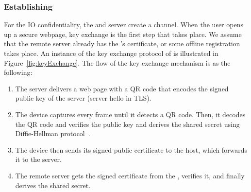 \subsubsection{Establishing \tls}
\label{sec:prototype:impl:tls}
%
For the IO confidentiality, the \device and server create a \tls channel. When the user opens up a secure webpage, key exchange is the first step that takes place. We assume that the remote server already has the \device's certificate, or some offline registration takes place. An instance of the key exchange protocol of \name is illustrated in Figure~\ref{fig:keyExchange}. The flow of the key exchange mechanism is as the following:
\begin{enumerate}
  \item[\one] The server delivers a web page with a QR code that encodes the signed public key of the server (server hello in TLS). 
  \item[\two] The device captures every frame until it detects a QR code. Then, it decodes the QR code and verifies the public key and derives the shared secret using Diffie-Hellman protocol~\cite{blake1998authenticated}. 
  \item[\three] The device then sends its signed public certificate to the host, which forwards it to the server.
  \item[\four] The remote server gets the signed certificate from the \device, verifies it, and finally derives the shared secret.
\end{enumerate}





